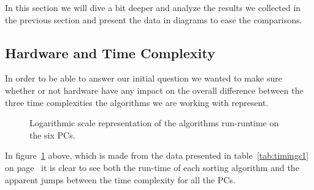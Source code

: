 
In this section we will dive a bit deeper and analyze the results we collected in the previous section and present the data in diagrams to ease the comparisons. 


\vspace{0.5cm}
\subsection{Hardware and Time Complexity}
\label{sec:4.1}
In order to be able to answer our initial question we wanted to make sure whether or not hardware have any impact on the overall difference between the three time complexities the algorithms we are working with represent.  

\begin{figure}[H]
  \caption{Logarithmic scale representation of the algorithms run-runtime on the six PCs.}
  \label{fig:pic1}
\end{figure}
In figure~\ref{fig:pic1} above, which is made from the data presented in table~\ref{tab:timings1} on page~\pageref{tab:timings1} it is clear to see both the run-time of each sorting algorithm and the apparent jumps between the time complexity for all the PCs. 

\vspace{0.5cm}
